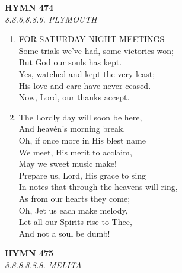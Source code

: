 \documentclass[11pt,a4paper]{article}
\begin{document}
\newpage
\begin{center}
    {\Large \textbf{HYMN 474}}
    \\
    \textit{8.8.6,8.8.6. PLYMOUTH}
\end{center}
\vspace{1em}

\begin{enumerate}
    \item FOR SATURDAY NIGHT MEETINGS \\
        Some trials we've had, some victorics won; \\
        But God our souls has kept. \\
        Yes, watched and kept the very least; \\
        His love and care have never ceased. \\
        Now, Lord, our thanks accept.

    \item The Lordly day will soon be here, \\
        And heavén's morning break. \\
        Oh, if once more in His blest name \\
        We meet, His merit to acclaim, \\
        May we sweet music make! \\
        Prepare us, Lord, His grace to sing \\
        In notes that through the heavens will ring, \\
        As from our hearts they come; \\
        Oh, Jet us each make melody, \\
        Let all our Spirits rise to Thee, \\
        And not a soul be dumb!

\end{enumerate}

\newpage
\begin{center}
    {\Large \textbf{HYMN 475}}
    \\
    \textit{8.8.8.8.8.8. MELITA}
\end{center}
\vspace{1em}
\end{document}
